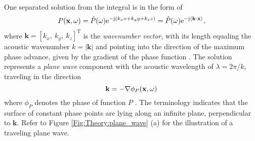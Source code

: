 \vspace{3mm}
One separated solution from the integral is in the form of \cite{Williams1999}
\begin{equation}
P(\mathbf{x},\omega) = \hat{P}(\omega) \mathrm{e}^{-\mathrm{j} \left( k_x x + k_y y + k_z z \right) } =  \hat{P}(\omega) \mathrm{e}^{-\mathrm{j} \left< \mathbf{k} \cdot \mathbf{x} \right> },
\end{equation}
where $\mathbf{k} = [k_x,\ k_y,\ k_z]^{\mathrm{T}}$ is the \emph{wavenumber vector}, with its length equaling the acoustic wavenumber $k = | \mathbf{k}|$ and pointing into the direction of the maximum phase advance, given by the gradient of the phase function  .
The solution represents a \emph{plane wave} component with the acoustic wavelength of $\lambda = 2\pi/k$, traveling in the direction
\begin{equation}
\mathbf{k} = - \nabla \phi_P(\mathbf{x},\omega)
\label{Eq:Theory:PW_wavenumber_vec}
\end{equation}
where $\phi_P$ denotes the phase of function $P$  .
The terminology indicates that the surface of constant phase points are lying along an infinite plane, perpendicular to $\mathbf{k}$. Refer to Figure \ref{Fig:Theory:plane_wave} (a) for the illustration of a traveling plane wave.

